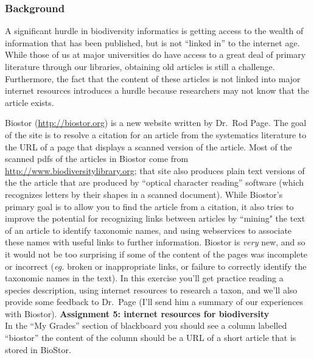 \documentclass[11pt]{article}
\begin{document}
\subsubsection*{Background}
A significant hurdle in biodiversity informatics is getting access to the wealth of information that has been published, but is not ``linked in'' to the internet age.
While those of us at major universities do have access to a great deal of primary literature through our libraries, obtaining old articles is still a challenge.
Furthermore, the fact that the content of these articles is not linked into major internet resources introduces a hurdle because researchers may not know that the article exists.

Biostor (\url{http://biostor.org}) is a new website written by Dr.\ Rod Page.
The goal of the site is to resolve a citation for an article from the systematics literature
to the URL of a page that displays a scanned version of the article.
Most of the scanned pdfs of the articles in Biostor come from \url{http://www.biodiversitylibrary.org};
 that site also produces plain text versions of the the article that are produced by ``optical character reading'' software (which recognizes letters by their shapes in a scanned document). While Biostor's primary goal is to allow you to find the article from a citation, it also tries to improve the potential for recognizing links between articles by ``mining" the text of an article to identify taxonomic names, and using webservices to associate these names with useful links to further information.
Biostor is {\em very} new, and so it would not be  too surprising if some of the content of the pages was incomplete or incorrect ({\em eg.} broken or inappropriate links, or failure to correctly identify the taxonomic names in the text).
In this exercise you'll get practice reading a species description, using internet resources to research a taxon, and we'll also provide some feedback to Dr.\ Page (I'll send him a summary of our experiences with Biostor).
\newpage
{\bf Assignment 5: internet resources for biodiversity}\\
In the ``My Grades'' section of blackboard you should see a column labelled ``biostor'' the content of the column should be a URL of a short article that is stored in BioStor.
\end{document}
